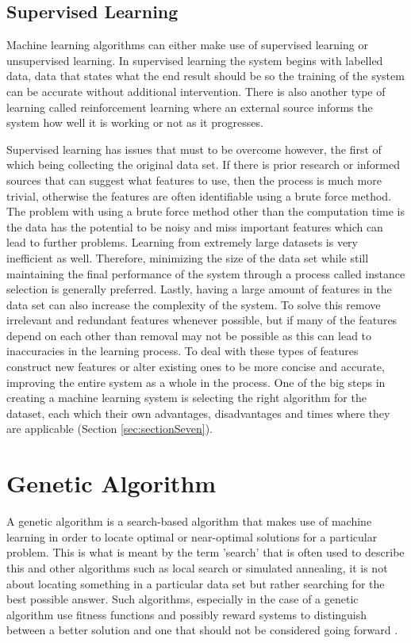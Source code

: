 \subsection{Supervised Learning} \label{sec:supervisedLearning}

Machine learning algorithms can either make use of supervised learning or unsupervised learning.  In supervised learning the system begins with labelled data, data that states what the end result should be so the training of the system can be accurate without additional intervention.  There is also another type of learning called reinforcement learning where an external source informs the system how well it is working or not as it progresses.

Supervised learning has issues that must to be overcome however, the first of which being collecting the original data set.  If there is prior research or informed sources that can suggest what features to use, then the process is much more trivial, otherwise the features are often identifiable using a brute force method.  The problem with using a brute force method other than the computation time is the data has the potential to be noisy and miss important features which can lead to further problems.  Learning from extremely large datasets is very inefficient as well.  Therefore, minimizing the size of the data set while still maintaining the final performance of the system through a process called instance selection is generally preferred.  Lastly, having a large amount of features in the data set can also increase the complexity of the system.  To solve this remove irrelevant and redundant features whenever possible, but if many of the features depend on each other than removal may not be possible as this can lead to inaccuracies in the learning process.  To deal with these types of features construct new features or alter existing ones to be more concise and accurate, improving the entire system as a whole in the process.  One of the big steps in creating a machine learning system is selecting the right algorithm for the dataset, each which their own advantages, disadvantages and times where they are applicable (Section \ref{sec:sectionSeven}).

\section{Genetic Algorithm} \label{sec:genAlgorithm}

A genetic algorithm is a search-based algorithm that makes use of machine learning in order to locate optimal or near-optimal solutions for a particular problem.  This is what is meant by the term 'search' that is often used to describe this and other algorithms such as local search or simulated annealing, it is not about locating something in a particular data set but rather searching for the best possible answer.  Such algorithms, especially in the case of a genetic algorithm use fitness functions and possibly reward systems to distinguish between a better solution and one that should not be considered going forward \cite{searchBasedSoftwareEngineering}.

